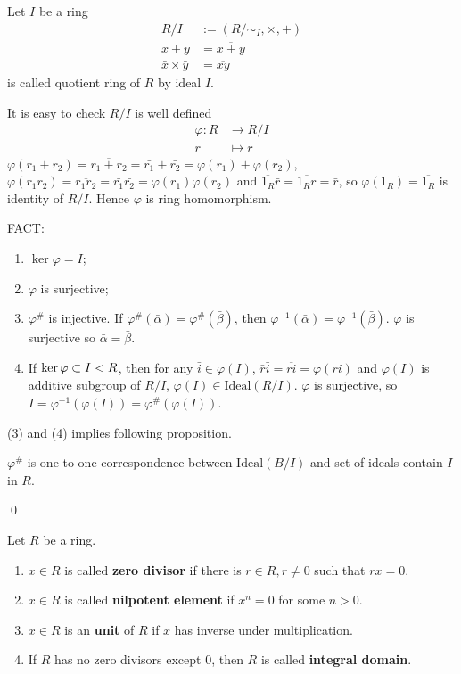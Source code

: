 \documentclass{amsart}
\begin{document}
\begin{secdefn}
	Let $I$ be a ring
	\[
	\begin{aligned}
		R/I &:= (R \big/ \sim_{I}, \times, +)\\
		\bar{x} + \bar{y} &= \overline{x+y}\\
		\bar{x} \times \bar{y} &= \overline{xy}
	\end{aligned}
	\]
	is called quotient ring of $R$ by ideal $I$.
\end{secdefn}
\begin{rem}
	It is easy to check $R/I$ is well defined
	\[
	\begin{aligned}
	\varphi: R &\rightarrow R/I\\
	r &\mapsto \bar{r}
	\end{aligned}
	\]
	$\varphi(r_1 + r_2)= \overline{r_1 + r_2} = \bar{r_1} + \bar{r_2}= \varphi(r_1) + \varphi(r_2)$, $\varphi(r_1 r_2) = \overline{r_1 r_2} = \bar{r_1} \bar{r_2} = \varphi(r_1) \varphi(r_2)$ and $\overline{1_R} \bar{r} = \overline{1_R r} = \bar{r}$, so $\varphi(1_R)= \overline{1_R}$ is identity of $R/I$. Hence $\varphi$ is ring homomorphism. 
\end{rem}
FACT: 
\begin{enumerate}
	\item $\ker \varphi = I$;
	\item $\varphi$ is surjective;
	\item $\varphi^{\#}$ is injective. If $\varphi^{\#}(\bar{\alpha}) = \varphi^{\#}(\bar{\beta})$, then $\varphi^{-1}(\bar{\alpha})=\varphi^{-1}(\bar{\beta})$. $\varphi$ is surjective so $\bar{\alpha} = \bar{\beta}$.
	\item If $\ker \varphi \subset I \vartriangleleft R$, then for any $\bar{i} \in \varphi(I)$, $\bar{r} \bar{i} = \overline{ri} = \varphi(ri)$ and $\varphi(I)$ is additive subgroup of $R/I$, $\varphi(I) \in \text{Ideal}(R/I)$. $\varphi$ is surjective, so $I= \varphi^{-1}(\varphi(I))= \varphi^{\#}(\varphi(I))$.
\end{enumerate}
(3) and (4) implies following proposition.
\begin{secprop}
	$\varphi^{\#}$ is one-to-one correspondence between $\text{Ideal}(B/I)$ and set of ideals contain $I$ in $R$.
\end{secprop}
\qed
\begin{secdefn}
	Let $R$ be a ring.
	\begin{enumerate}
		\item $x \in R$ is called \textbf{zero divisor} if there is $r \in R, r \neq 0$ such that $rx=0$.
		\item $x \in R$ is called \textbf{nilpotent element} if $x^n=0$ for some $n > 0$.
		\item $x \in R$ is an \textbf{unit} of $R$ if $x$ has inverse under multiplication.
		\item If $R$ has no zero divisors except 0, then $R$ is called \textbf{integral domain}.
	\end{enumerate}	
\end{secdefn}
\end{document}
